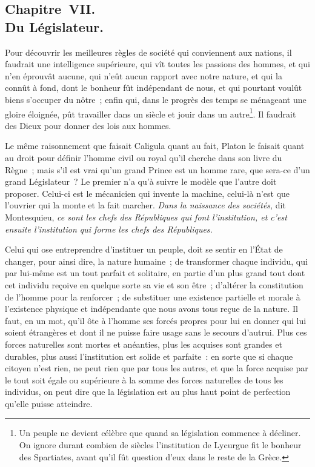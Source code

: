 \documentclass[french,twoside]{book} %
\begin{document}
\subsection[{Chapitre VII. Du Législateur.}]{Chapitre VII. \\
Du Législateur.}
\noindent Pour découvrir les meilleures règles de société qui conviennent aux nations, il faudrait une intelligence supérieure, qui vît toutes les passions des hommes, et qui n’en éprouvât aucune, qui n’eût aucun rapport avec notre nature, et qui la connût à fond, dont le bonheur fût indépendant de nous, et qui pourtant voulût biens s’occuper du nôtre ; enfin qui, dans le progrès des temps se ménageant une gloire éloignée, pût travailler dans un siècle et jouir dans un autre\footnote{Un peuple ne devient célèbre que quand sa législation commence à décliner. On ignore durant combien de siècles l’institution de Lycurgue fit le bonheur des Spartiates, avant qu’il fût question d’eux dans le reste de la Grèce.}. Il faudrait des Dieux pour donner des lois aux hommes.\par
Le même raisonnement que faisait Caligula quant au fait, Platon le faisait quant au droit pour définir l’homme civil ou royal qu’il cherche dans son livre du Règne ; mais s’il est vrai qu’un grand Prince est un homme rare, que sera-ce d’un grand Législateur ? Le premier n’a qu’à suivre le modèle que l’autre doit proposer. Celui-ci est le mécanicien qui invente la machine, celui-là n’est que l’ouvrier qui la monte et la fait marcher. {\itshape Dans la naissance des sociétés}, dit Montesquieu, {\itshape ce sont les chefs des Républiques qui font l’institution, et c’est ensuite l’institution qui forme les chefs des Républiques.}\par
Celui qui ose entreprendre d’instituer un peuple, doit se sentir en l’État de changer, pour ainsi dire, la nature humaine ; de transformer chaque individu, qui par lui-même est un tout parfait et solitaire, en partie d’un plus grand tout dont cet individu reçoive en quelque sorte sa vie et son être ; d’altérer la constitution de l’homme pour la renforcer ; de substituer une existence partielle et morale à l’existence physique et indépendante que nous avons tous reçue de la nature. Il faut, en un mot, qu’il ôte à l’homme ses forcés propres pour lui en donner qui lui soient étrangères et dont il ne puisse faire usage sans le secours d’autrui. Plus ces forces naturelles sont mortes et anéanties, plus les acquises sont grandes et durables, plus aussi l’institution est solide et parfaite : en sorte que si chaque citoyen n’est rien, ne peut rien que par tous les autres, et que la force acquise par le tout soit égale ou supérieure à la somme des forces naturelles de tous les individus, on peut dire que la législation est au plus haut point de perfection qu’elle puisse atteindre.\par
\end{document}
